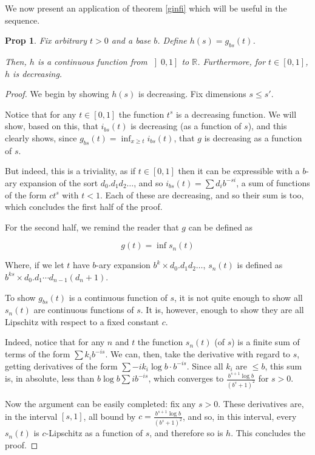 \documentclass[11pt, reqno]{amsart}
\newcommand{\R}{\mathbb{R}}
\newtheorem{prop}{Prop}
\begin{document}
We now present an application of theorem \ref{ginfi} which will be useful in the sequence.

\begin{prop} \label{gfuncofs}
Fix arbitrary $t > 0$ and a base $b$. Define $h(s) = g_{bs}(t)$.

Then, $h$ is a continuous function from $\left]0, 1 \right]$ to $\R$. Furthermore, for $t \in \left[0, 1 \right]$, $h$ is decreasing.
\end{prop}

\begin{proof}
We begin by showing $h(s)$ is decreasing. Fix dimensions $s \leq s'$.

Notice that for any $t \in \left[0, 1 \right]$ the function $t^s$ is a decreasing function. We will show, based on this, that $i_{bs}(t)$ is decreasing (as a function of $s$), and this clearly shows, since $g_{bs}(t) = \inf_{x \geq t} i_{bs}(t)$, that $g$ is decreasing as a function of $s$.

But indeed, this is a triviality, as if $t \in \left[0, 1\right]$ then it can be expressible with a $b$-ary expansion of the sort $d_0 . d_1 d_2 \dots$, and so $i_{bs}(t) = \sum d_i b^{-si}$, a sum of functions of the form $c t^s$ with $t < 1$. Each of these are decreasing, and so their sum is too, which concludes the first half of the proof.

For the second half, we remind the reader that $g$ can be defined as

\[g(t) = \inf s_n(t)\]

Where, if we let $t$ have $b$-ary expansion $b^k \times d_0 . d_1 d_2 \dots$, $s_n(t)$ is defined as $b^{ks} \times d_0 . d_1 \cdots d_{n-1} (d_n + 1)$.

To show $g_{bs}(t)$ is a continuous function of $s$, it is not quite enough to show all $s_n(t)$ are continuous functions of $s$. It is, however, enough to show they are all Lipschitz with respect to a fixed constant $c$.

Indeed, notice that for any $n$ and $t$ the function $s_n(t)$ (of $s$) is a finite sum of terms of the form $\sum k_i b^{-is}$.  We can, then, take the derivative with regard to $s$, getting derivatives of the form $\sum - i k_i \log b \cdot b^{-is}$. Since all $k_i$ are $\leq b$, this sum is, in absolute, less than $b \log b \sum i b^{-is}$, which converges to $\frac{b^{s+1} \log b}{(b^s + 1)^2}$ for $s > 0$.

Now the argument can be easily completed: fix any $s > 0$. These derivatives are, in the interval $\left[s, 1 \right]$, all bound by $c = \frac{b^{s+1} \log b}{(b^s + 1)^2}$, and so, in this interval, every $s_n(t)$ is $c$-Lipschitz as a function of $s$, and therefore so is $h$. This concludes the proof.
\end{proof}
\end{document}
